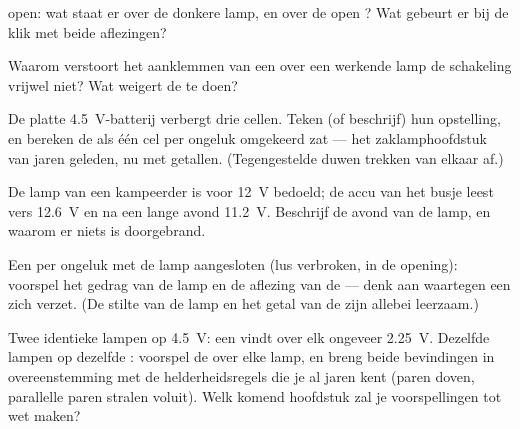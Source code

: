 \begin{exercise}[$\star$]\label{exo:g8:voltage-voltmeter:7}
 open: wat staat er over de donkere lamp, en over de
open ? Wat gebeurt er bij de klik met beide
aflezingen?
\end{exercise}

\begin{exercise}[$\star$]\label{exo:g8:voltage-voltmeter:8}
Waarom verstoort het aanklemmen van een  over een
werkende lamp de schakeling vrijwel niet? Wat weigert de  te
doen?
\end{exercise}

\begin{exercise}[$\star\star$]\label{exo:g8:voltage-voltmeter:9}
De platte \qty{4.5}{V}-batterij verbergt drie cellen. Teken (of
beschrijf) hun opstelling, en bereken de  als één cel per
ongeluk omgekeerd zat --- het zaklamphoofdstuk van jaren geleden, nu
met getallen. (Tegengestelde duwen trekken van elkaar af.)
\end{exercise}

\begin{exercise}[$\star\star$]\label{exo:g8:voltage-voltmeter:10}
De lamp van een kampeerder is voor \qty{12}{V} bedoeld; de
accu van het busje leest vers \qty{12.6}{V} en na een lange
avond \qty{11.2}{V}. Beschrijf de avond van de lamp, en waarom er niets
is doorgebrand.
\end{exercise}

\begin{exercise}[$\star\star$]\label{exo:g8:voltage-voltmeter:11}
Een  per ongeluk \emph{} met de lamp
aangesloten (lus verbroken,  in de opening): voorspel het gedrag
van de lamp en de aflezing van de  --- denk aan waartegen een
 zich verzet. (De stilte van de lamp en het getal van
de  zijn allebei leerzaam.)
\end{exercise}

\begin{exercise}[$\star\star\star$]\label{exo:g8:voltage-voltmeter:12}
Twee identieke lampen  op \qty{4.5}{V}: een
 vindt over elk ongeveer \qty{2.25}{V}. Dezelfde lampen
 op dezelfde : voorspel de
 over elke lamp, en breng beide bevindingen in
overeenstemming met de helderheidsregels die je al jaren kent (paren  doven, parallelle paren stralen voluit). Welk komend hoofdstuk
zal je voorspellingen tot wet maken?
\end{exercise}

